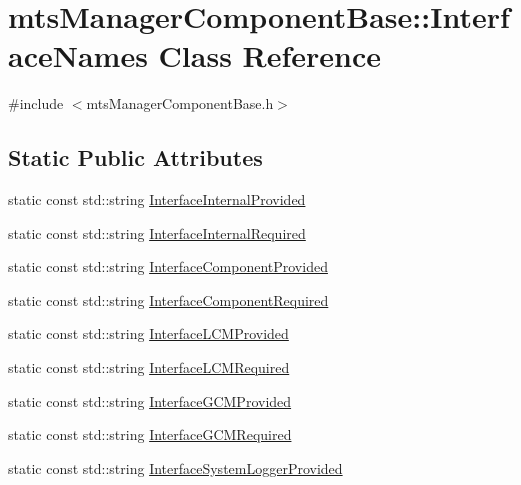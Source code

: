 \hypertarget{classmts_manager_component_base_1_1_interface_names}{\section{mts\-Manager\-Component\-Base\-:\-:Interface\-Names Class Reference}
\label{classmts_manager_component_base_1_1_interface_names}
}


{\ttfamily \#include $<$mts\-Manager\-Component\-Base.\-h$>$}

\subsection*{Static Public Attributes}
\begin{DoxyCompactItemize}
\item 
static const std\-::string \hyperlink{classmts_manager_component_base_1_1_interface_names_ab4d18be3e87863dc76b22ba59ef7bf09}{Interface\-Internal\-Provided}
\item 
static const std\-::string \hyperlink{classmts_manager_component_base_1_1_interface_names_a439bf85d1ca10ffe320b0137a20294ba}{Interface\-Internal\-Required}
\item 
static const std\-::string \hyperlink{classmts_manager_component_base_1_1_interface_names_a7a409f1497301d9bbee5d6d0fea401c7}{Interface\-Component\-Provided}
\item 
static const std\-::string \hyperlink{classmts_manager_component_base_1_1_interface_names_a7a33d7dcfd76e820ca863b14b6931b77}{Interface\-Component\-Required}
\item 
static const std\-::string \hyperlink{classmts_manager_component_base_1_1_interface_names_adab745bca44cb20fe2dc8fe1e849bdd9}{Interface\-L\-C\-M\-Provided}
\item 
static const std\-::string \hyperlink{classmts_manager_component_base_1_1_interface_names_a47bbe7357609b36bd957f461bcf79930}{Interface\-L\-C\-M\-Required}
\item 
static const std\-::string \hyperlink{classmts_manager_component_base_1_1_interface_names_a2e6d82fed60eceeea54911f9a9963346}{Interface\-G\-C\-M\-Provided}
\item 
static const std\-::string \hyperlink{classmts_manager_component_base_1_1_interface_names_a15a22d6897fbc59047ae2df0973b9e1a}{Interface\-G\-C\-M\-Required}
\item 
static const std\-::string \hyperlink{classmts_manager_component_base_1_1_interface_names_ad5ed77aeed44addf0fbb46df6c621012}{Interface\-System\-Logger\-Provided}

\end{DoxyCompactItemize}
